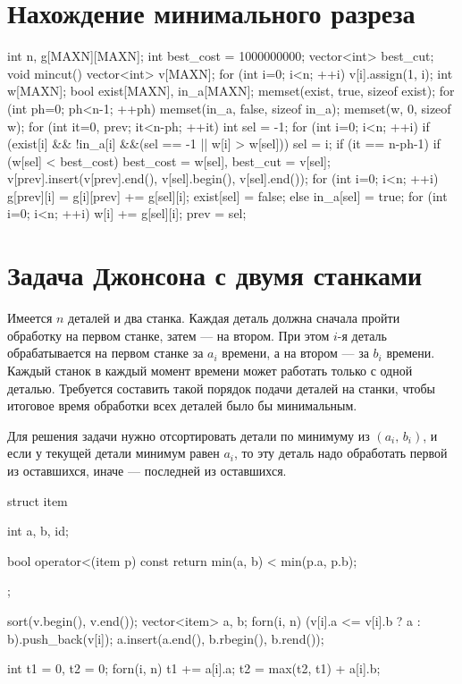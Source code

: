 \documentclass[12pt, titlepage]{article}
\begin{document}
\section{Нахождение минимального разреза}
\begin{cppcode}
int n, g[MAXN][MAXN];
int best_cost = 1000000000;
vector<int> best_cut;
 void mincut() {
    vector<int> v[MAXN];
    for (int i=0; i<n; ++i)
        v[i].assign(1, i);
    int w[MAXN];
    bool exist[MAXN], in_a[MAXN];
    memset(exist, true, sizeof exist);
    for (int ph=0; ph<n-1; ++ph) {
        memset(in_a, false, sizeof in_a);
        memset(w, 0, sizeof w);
        for (int it=0, prev; it<n-ph; ++it) {
            int sel = -1;
            for (int i=0; i<n; ++i)
                if (exist[i] && !in_a[i] &&(sel == -1 || w[i] > w[sel]))
                    sel = i;
            if (it == n-ph-1) {
                if (w[sel] < best_cost)
                    best_cost = w[sel],  best_cut = v[sel];
                v[prev].insert(v[prev].end(), v[sel].begin(), v[sel].end());
                for (int i=0; i<n; ++i)
                    g[prev][i] = g[i][prev] += g[sel][i];
                exist[sel] = false;
            }
            else {
                in_a[sel] = true;
                for (int i=0; i<n; ++i)
                    w[i] += g[sel][i];
                prev = sel;
            }
        }
    }
}
\end{cppcode}


\section{Задача Джонсона с двумя станками}

Имеется $n$ деталей и два станка. Каждая деталь должна сначала пройти обработку на первом станке, затем — на втором. При этом $i$-я деталь обрабатывается на первом станке за $a_i$ времени, а на втором — за $b_i$ времени. Каждый станок в каждый момент времени может работать только с одной деталью. Требуется составить такой порядок подачи деталей на станки, чтобы итоговое время обработки всех деталей было бы минимальным.

Для решения задачи нужно отсортировать детали по минимуму из $(a_i,\,b_i)$, и если у текущей детали минимум равен $a_i$, то эту деталь надо обработать первой из оставшихся, иначе — последней из оставшихся.

\begin{cppcode}
struct item {
    int a, b, id;
 
    bool operator<(item p) const {
        return min(a, b) < min(p.a, p.b);
    }
};
 
 
sort(v.begin(), v.end());
vector<item> a, b;
forn(i, n)
   (v[i].a <= v[i].b ? a : b).push_back(v[i]);
a.insert(a.end(), b.rbegin(), b.rend());
 
int t1 = 0, t2 = 0;
forn(i, n) {
    t1 += a[i].a;
    t2 = max(t2, t1) + a[i].b;
}
\end{cppcode}
\end{document}
